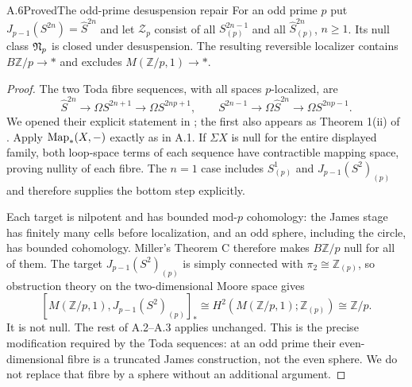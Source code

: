 \begin{claim}{A.6}{Proved}{The odd-prime desuspension repair}
For an odd prime $p$ put $J_{p-1}(S^{2n})=\widehat S^{2n}$ and let $\mathcal Z_p$ consist of all $S^{2n-1}_{(p)}$ and all $\widehat S^{2n}_{(p)}$, $n\geq1$. Its null class $\mathfrak N_p$ is closed under desuspension. The resulting reversible localizer contains $B\mathbb Z/p\to *$ and excludes $M(\mathbb Z/p,1)\to *$.
\end{claim}
\begin{proof}
The two Toda fibre sequences, with all spaces $p$-localized, are
\[
 \widehat S^{2n}\longrightarrow\Omega S^{2n+1}
       \longrightarrow\Omega S^{2np+1},\qquad
 S^{2n-1}\longrightarrow\Omega\widehat S^{2n}
       \longrightarrow\Omega S^{2np-1}.
\]
We opened their explicit statement in \citet[p.~80, item (ii)]{BodigheimerHenn1983}; the first also appears as Theorem 1(ii) of \citet{RavenelEHP2005}. Apply $\operatorname{Map}_*(X,-)$ exactly as in A.1. If $\Sigma X$ is null for the entire displayed family, both loop-space terms of each sequence have contractible mapping space, proving nullity of each fibre. The $n=1$ case includes $S^1_{(p)}$ and $J_{p-1}(S^2)_{(p)}$ and therefore supplies the bottom step explicitly.

Each target is nilpotent and has bounded mod-$p$ cohomology: the James stage has finitely many cells before localization, and an odd sphere, including the circle, has bounded cohomology. Miller's Theorem C therefore makes $B\mathbb Z/p$ null for all of them. The target $J_{p-1}(S^2)_{(p)}$ is simply connected with $\pi_2\cong\mathbb Z_{(p)}$, so obstruction theory on the two-dimensional Moore space gives
\[
 [M(\mathbb Z/p,1),J_{p-1}(S^2)_{(p)}]_*
      \cong H^2(M(\mathbb Z/p,1);\mathbb Z_{(p)})
      \cong\mathbb Z/p.
\]
It is not null. The rest of A.2--A.3 applies unchanged. This is the precise modification required by the Toda sequences: at an odd prime their even-dimensional fibre is a truncated James construction, not the even sphere. We do not replace that fibre by a sphere without an additional argument.
\end{proof}

